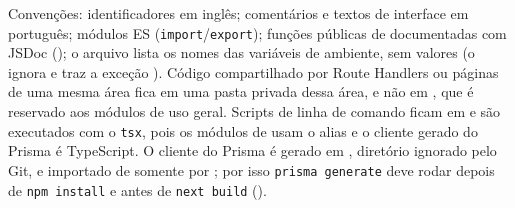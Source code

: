 Convenções: identificadores em inglês; comentários e textos de interface em português; módulos ES (\texttt{import}/\texttt{export}); funções públicas de  documentadas com JSDoc (); o arquivo  lista os nomes das variáveis de ambiente, sem valores (o  ignora  e traz a exceção ). Código compartilhado por Route Handlers ou páginas de uma mesma área fica em uma pasta privada  dessa área, e não em , que é reservado aos módulos de uso geral. Scripts de linha de comando ficam em  e são executados com o \texttt{tsx}, pois os módulos de  usam o alias  e o cliente gerado do Prisma é TypeScript. O cliente do Prisma é gerado em , diretório ignorado pelo Git, e importado de  somente por ; por isso \texttt{prisma generate} deve rodar depois de \texttt{npm install} e antes de \texttt{next build} ().
